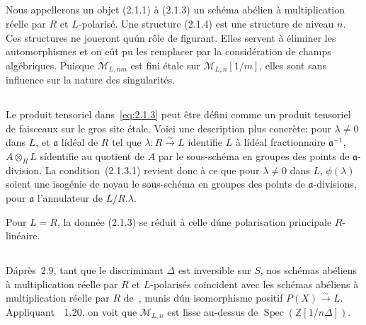 \documentclass[11pt,a4paper]{article}
\theoremstyle{plain}
\theoremstyle{definition}
\DeclareMathOperator{\Spec}{Spec}
\begin{document}
\subsection{}

Nous appellerons un objet (2.1.1) \`a (2.1.3) un sch\'ema ab\'elien \`a multiplication
r\'eelle par $R$ et $L$-polaris\'e. Une structure (2.1.4) est une structure de niveau
$n$. Ces structures ne joueront qu\'un r\^ole de figurant. Elles servent \`a \'eliminer les
automorphismes et on e\^ut pu les remplacer par la consid\'eration de champs
alg\'ebriques. Puisque $\mathscr{M}_{L,nm}$ est fini \'etale sur $\mathscr{M}_{L,n}[1/m]$, elles sont sans influence
sur la nature des singularit\'es.

\subsection{}

Le produit tensoriel dans~\eqref{eq:2.1.3} peut \^etre d\'efini comme un produit
tensoriel de faisceaux sur le gros site \'etale. Voici une description plus concr\`ete:
pour $\lambda \neq 0$ dans $L$, et $\mathfrak{a}$ l\'id\'eal de $R$ tel que $\lambda: R \xrightarrow{\sim} L$ identifie $L$ \`a l\'id\'eal
fractionnaire $\mathfrak{a}^{-1}$, $A \otimes_R L$ s\'identifie au quotient de $A$ par le sous-sch\'ema en
groupes des points de $\mathfrak{a}$-division. La condition~(2.1.3.1) revient donc \`a ce que
pour $\lambda \neq 0$ dans $L$, $\phi(\lambda)$ soient une isog\'enie de noyau le sous-sch\'ema en
groupes des points de $\mathfrak{a}$-divisions, pour $\mathfrak{a}$ l'annulateur de $L/R.\lambda$.

Pour $L = R$, la donn\'ee (2.1.3) se r\'eduit \`a celle d\'une polarisation principale
$R$-lin\'eaire.

\subsection{}

D\'apr\`es~2.9, tant que le discriminant $\Delta$ est inversible sur $S$, nos sch\'emas
ab\'eliens \`a multiplication r\'eelle par $R$ et $L$-polaris\'es co\"{i}ncident avec les sch\'emas
ab\'eliens \`a multiplication r\'eelle par $R$ de~\cite{Rapoport}, munis d\'un isomorphisme
positif $P(X) \xrightarrow{\sim} L$. Appliquant~\cite{Rapoport}~1.20, on voit que $\mathscr{M}_{L,n}$ est lisse au-dessus de
$\Spec(\mathbb{Z}[1/n\Delta])$.

\subsection{}
\end{document}

